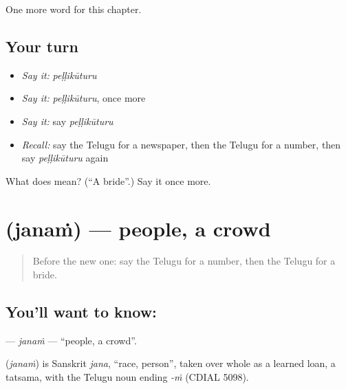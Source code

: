 \begin{grammarlens}[title={What you've built}]
One more word for this chapter.
\end{grammarlens}

\subsection*{Your turn}
\begin{itemize}
\raggedright
  \item \emph{Say it:} \emph{peḷḷikūturu}
  \item \emph{Say it:} \emph{peḷḷikūturu}, once more
  \item \emph{Say it:} say \emph{peḷḷikūturu}
  \item \emph{Recall:} say the Telugu for a newspaper, then the Telugu for a number, then say \emph{peḷḷikūturu} again
\end{itemize}

\begin{tcolorbox}[breakable,colback=teal!4,colframe=teal!35!black,title={Before you move on}]
What does  mean? (\textquotedblleft{}A bride\textquotedblright{}.) Say it once more.
\end{tcolorbox}
\section[\texorpdfstring{\te{జనం} (janaṁ)}{జనం (janaṁ)}]{ (janaṁ) — people, a crowd}

\label{lesson:TE-C265-janam}



\begin{quote}
Before the new one: say the Telugu for a number, then the Telugu for a bride.
\end{quote}

\subsection*{You'll want to know: }
\textbf{} — \emph{janaṁ} — \textquotedblleft{}people, a crowd\textquotedblright{}.

\begin{cousinweb}
\textbf{} (\emph{janaṁ}) is Sanskrit \emph{jana}, \textquotedblleft{}race, person\textquotedblright{}, taken over whole as a learned loan, a tatsama, with the Telugu noun ending \emph{-ṁ} (CDIAL 5098).
\end{cousinweb}

